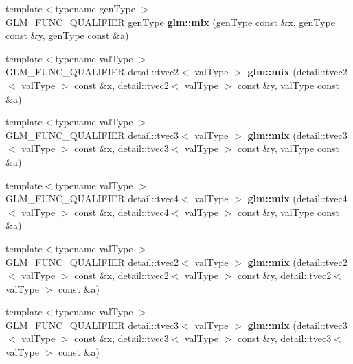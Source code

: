 \begin{DoxyCompactItemize}
\item 
\hypertarget{namespaceglm_aeb446a8cbaa969dc99860da8631953a2}{}{\footnotesize template$<$typename gen\+Type $>$ }\\G\+L\+M\+\_\+\+F\+U\+N\+C\+\_\+\+Q\+U\+A\+L\+I\+F\+I\+E\+R gen\+Type {\bfseries glm\+::mix} (gen\+Type const \&x, gen\+Type const \&y, gen\+Type const \&a)\label{namespaceglm_aeb446a8cbaa969dc99860da8631953a2}

\item 
\hypertarget{namespaceglm_a88381b0b323b81006631a80bc96be264}{}{\footnotesize template$<$typename val\+Type $>$ }\\G\+L\+M\+\_\+\+F\+U\+N\+C\+\_\+\+Q\+U\+A\+L\+I\+F\+I\+E\+R detail\+::tvec2$<$ val\+Type $>$ {\bfseries glm\+::mix} (detail\+::tvec2$<$ val\+Type $>$ const \&x, detail\+::tvec2$<$ val\+Type $>$ const \&y, val\+Type const \&a)\label{namespaceglm_a88381b0b323b81006631a80bc96be264}

\item 
\hypertarget{namespaceglm_ad022d17436c903bd69bc79c946eaa323}{}{\footnotesize template$<$typename val\+Type $>$ }\\G\+L\+M\+\_\+\+F\+U\+N\+C\+\_\+\+Q\+U\+A\+L\+I\+F\+I\+E\+R detail\+::tvec3$<$ val\+Type $>$ {\bfseries glm\+::mix} (detail\+::tvec3$<$ val\+Type $>$ const \&x, detail\+::tvec3$<$ val\+Type $>$ const \&y, val\+Type const \&a)\label{namespaceglm_ad022d17436c903bd69bc79c946eaa323}

\item 
\hypertarget{namespaceglm_a21927ebc9e2b86daab771d2069c4c360}{}{\footnotesize template$<$typename val\+Type $>$ }\\G\+L\+M\+\_\+\+F\+U\+N\+C\+\_\+\+Q\+U\+A\+L\+I\+F\+I\+E\+R detail\+::tvec4$<$ val\+Type $>$ {\bfseries glm\+::mix} (detail\+::tvec4$<$ val\+Type $>$ const \&x, detail\+::tvec4$<$ val\+Type $>$ const \&y, val\+Type const \&a)\label{namespaceglm_a21927ebc9e2b86daab771d2069c4c360}

\item 
\hypertarget{namespaceglm_abad2ba3256140043522f23b88ac0bc20}{}{\footnotesize template$<$typename val\+Type $>$ }\\G\+L\+M\+\_\+\+F\+U\+N\+C\+\_\+\+Q\+U\+A\+L\+I\+F\+I\+E\+R detail\+::tvec2$<$ val\+Type $>$ {\bfseries glm\+::mix} (detail\+::tvec2$<$ val\+Type $>$ const \&x, detail\+::tvec2$<$ val\+Type $>$ const \&y, detail\+::tvec2$<$ val\+Type $>$ const \&a)\label{namespaceglm_abad2ba3256140043522f23b88ac0bc20}

\item 
\hypertarget{namespaceglm_ac1c594d4879991af37ac47120d17020a}{}{\footnotesize template$<$typename val\+Type $>$ }\\G\+L\+M\+\_\+\+F\+U\+N\+C\+\_\+\+Q\+U\+A\+L\+I\+F\+I\+E\+R detail\+::tvec3$<$ val\+Type $>$ {\bfseries glm\+::mix} (detail\+::tvec3$<$ val\+Type $>$ const \&x, detail\+::tvec3$<$ val\+Type $>$ const \&y, detail\+::tvec3$<$ val\+Type $>$ const \&a)\label{namespaceglm_ac1c594d4879991af37ac47120d17020a}


\end{DoxyCompactItemize}
